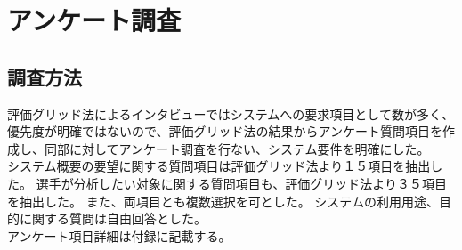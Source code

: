 \documentclass[sotsuron]{kuee}
\begin{document}
\section{アンケート調査}
\subsection{調査方法}
評価グリッド法によるインタビューではシステムへの要求項目として数が多く、優先度が明確ではないので、評価グリッド法の結果からアンケート質問項目を作成し、同部に対してアンケート調査を行ない、システム要件を明確にした。
\\システム概要の要望に関する質問項目は評価グリッド法より１５項目を抽出した。
選手が分析したい対象に関する質問項目も、評価グリッド法より３５項目を抽出した。
また、両項目とも複数選択を可とした。
システムの利用用途、目的に関する質問は自由回答とした。
\\アンケート項目詳細は付録に記載する。
\end{document}
